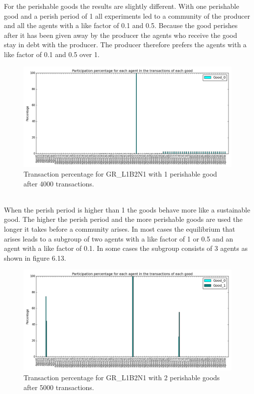 \documentclass[twoside,openright]{uva-bachelor-thesis}
\begin{document}
For the perishable goods the results are slightly different. With one perishable good and a perish period of 1 all experiments led to a community of the producer and all the agents with a like factor of 0.1 and 0.5. Because the good perishes after it has been given away by the producer the agents who receive the good stay in debt with the producer. The producer therefore prefers the agents with a like factor of 0.1 and 0.5 over 1. \\
\begin{figure}[h!]
  \centering
  \includegraphics[scale=0.4]{Simulation2_figures/GR_L1B2N1/Figure5_1perishable_4k}
  \caption{Transaction percentage for GR\_L1B2N1 with 1 perishable good after 4000 transactions.}
\end{figure}
 \\
When the perish period is higher than 1 the goods behave more like a sustainable good. The higher the perish period and the more perishable goods are used the longer it takes before a community arises. In most cases the equilibrium that arises leads to a subgroup of two agents with a like factor of 1 or 0.5 and an agent with a like factor of 0.1. In some cases the subgroup consists of 3 agents as shown in figure 6.13.\\
\begin{figure}[h!]
  \centering
 \includegraphics[scale=0.4]{Simulation2_figures/GR_L1B2N1/Figure6_2perishable_5k} 
  \caption{Transaction percentage for GR\_L1B2N1 with 2 perishable goods after 5000 transactions.}
\end{figure}
\end{document}
